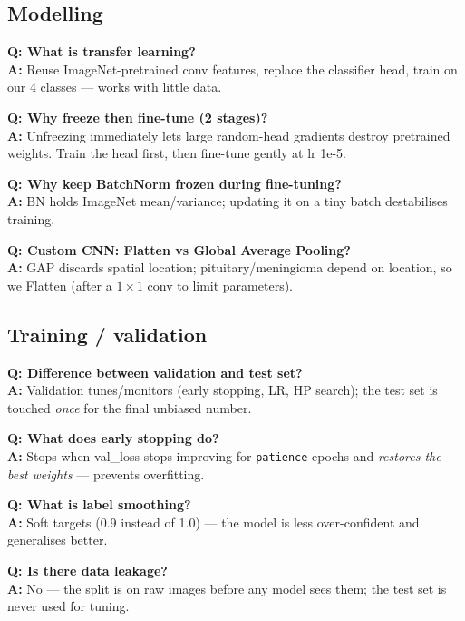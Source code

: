 \documentclass[11pt,a4paper]{article}
\newcommand{\code}[1]{\colorbox{codebg}{\small\texttt{#1}}}
\newcommand{\Q}[1]{\textbf{\color{navy}Q: #1}\\}
\newcommand{\A}[1]{\textbf{\color{ok}A:} #1}
\begin{document}
\subsection*{Modelling}
\begin{qabox}
\Q{What is transfer learning?}
\A{Reuse ImageNet-pretrained conv features, replace the classifier head, train on our 4 classes --- works with little data.}
\end{qabox}
\begin{qabox}
\Q{Why freeze then fine-tune (2 stages)?}
\A{Unfreezing immediately lets large random-head gradients destroy pretrained weights. Train the head first, then fine-tune gently at lr 1e-5.}
\end{qabox}
\begin{qabox}
\Q{Why keep BatchNorm frozen during fine-tuning?}
\A{BN holds ImageNet mean/variance; updating it on a tiny batch destabilises training.}
\end{qabox}
\begin{qabox}
\Q{Custom CNN: Flatten vs Global Average Pooling?}
\A{GAP discards spatial location; pituitary/meningioma depend on location, so we Flatten (after a $1\times1$ conv to limit parameters).}
\end{qabox}

\subsection*{Training / validation}
\begin{qabox}
\Q{Difference between validation and test set?}
\A{Validation tunes/monitors (early stopping, LR, HP search); the test set is touched \emph{once} for the final unbiased number.}
\end{qabox}
\begin{qabox}
\Q{What does early stopping do?}
\A{Stops when val\_loss stops improving for \code{patience} epochs and \emph{restores the best weights} --- prevents overfitting.}
\end{qabox}
\begin{qabox}
\Q{What is label smoothing?}
\A{Soft targets (0.9 instead of 1.0) --- the model is less over-confident and generalises better.}
\end{qabox}
\begin{qabox}
\Q{Is there data leakage?}
\A{No --- the split is on raw images before any model sees them; the test set is never used for tuning.}
\end{qabox}
\end{document}
